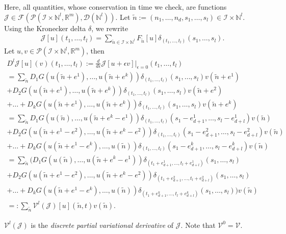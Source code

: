 \documentclass[runningheads]{llncs}
\newcommand{\Rr}{\mathbb{R}}
\newcommand{\Nn}{\mathbb{N}}
\newcommand{\1}{\chi}
\newcommand{\Ii}{\mathcal{I}}
\begin{document}
Here, all quantities, whose conservation in time we check, are functions $\mathcal{J}\in\mathcal{F}(\mathcal{P}(\Ii\times\Nn^l,\Rr^m),\mathcal{D}(\Nn^l))$. 
Let $\tilde{n}:=(n_1,\dots,n_d,s_1,\dots,s_l)\in\Ii\times\Nn^l$. Using the Kronecker delta $\delta$, we rewrite
\begin{gather*}
	\mathcal{J}[u](t_1,\ldots,t_{l})
	=\sum_{\tilde{n}\in\Ii\times\Nn^l}F_{\tilde{n}}[u]\delta_{(t_1,\ldots,t_{l})}(s_1,\ldots,s_l).
\end{gather*}
Let $u,v\in\mathcal{P}(\Ii\times\Nn^l,\Rr^m)$, then
\footnotesize
\begin{gather*}
	D^l\mathcal{J}[u](v)(t_1,\ldots,t_{l}):=\frac{d}{d\epsilon}\mathcal{J}[u+\epsilon v]\Big|_{\epsilon=0}(t_1,\ldots,t_{l})\\
	=\sum_{\tilde{n}}D_1G(u(\tilde{n}+e^1),\ldots,u(\tilde{n}+e^k))\delta_{(t_1,\ldots,t_{l})}(s_1,\ldots,s_l)v(\tilde{n}+e^1)\\
	+D_2G(u(\tilde{n}+e^1),\ldots,u(\tilde{n}+e^k))\delta_{(t_1,\ldots,t_{l})}(s_1,\ldots,s_l)v(\tilde{n}+e^2)\\+\ldots
	+D_kG(u(\tilde{n}+e^1),\ldots,u(\tilde{n}+e^k))\delta_{(t_1,\ldots,t_{l})}(s_1,\ldots,s_l)v(\tilde{n}+e^k)\\
	=\sum_{\tilde{n}}D_1G(u(\tilde{n}),\ldots,u(\tilde{n}+e^k-e^1))\delta_{(t_1,\ldots,t_{l})}(s_1-e^1_{d+1},\ldots,s_l-e^1_{d+l})v(\tilde{n})\\
	+D_2G(u(\tilde{n}+e^1-e^2),\ldots,u(\tilde{n}+e^k-e^2))\delta_{(t_1,\ldots,t_{l})}(s_1-e^2_{d+1},\ldots,s_l-e^2_{d+l})v(\tilde{n})\\+\ldots
	+D_kG(u(\tilde{n}+e^1-e^k),\ldots,u(\tilde{n}))\delta_{(t_1,\ldots,t_{l})}(s_1-e^k_{d+1},\ldots,s_l-e^k_{d+l})v(\tilde{n})\\
	=\sum_{\tilde{n}}\Big(D_1G(u(\tilde{n}),\ldots,u(\tilde{n}+e^k-e^1))\delta_{(t_1+e^1_{d+1},\ldots,t_{l}+e^1_{d+l})}(s_1,\ldots,s_l)\\
	+D_2G(u(\tilde{n}+e^1-e^2),\ldots,u(\tilde{n}+e^k-e^2))\delta_{(t_1+e^2_{d+1},\ldots,t_{l}+e^2_{d+l})}(s_1,\ldots,s_l)\\+\ldots
	+D_kG(u(\tilde{n}+e^1-e^k),\ldots,u(\tilde{n}))\delta_{(t_1+e^k_{d+1},\ldots,t_{l}+e^k_{d+l})}(s_1,\ldots,s_l)\Big)v(\tilde{n})\\
	=:\sum_{\tilde{n}}\mathcal{V}^l(\mathcal{J})[u](\tilde{n},t)v(\tilde{n}).
\end{gather*}
\normalsize
\begin{definition}
$\mathcal{V}^l(\mathcal{J})$ is the \emph{discrete partial variational derivative} of $\mathcal{J}$.
	Note that $\mathcal{V}^0=\mathcal{V}$.
\end{definition}
\end{document}
